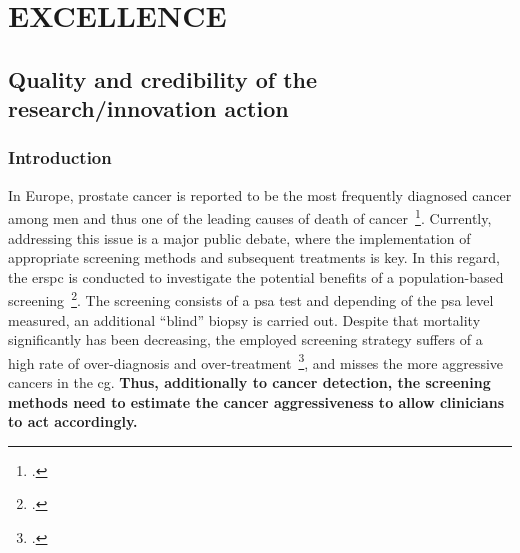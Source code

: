 \section{EXCELLENCE}
\label{sec:excellence}

\subsection{Quality and credibility of the research/innovation action}
\label{sec:quality}

\subsubsection{Introduction}
\label{sec:introduction}

In Europe, prostate cancer is reported to be the most frequently diagnosed cancer among men and thus one of the leading causes of death of cancer~\footcite{Ferlay2013}. 
Currently, addressing this issue is a major public debate, where the implementation of appropriate screening methods and subsequent treatments is key.
In this regard, the \ac{erspc} is conducted to investigate the potential benefits of a population-based screening~\footcite{Schroder2015}. 
The screening consists of a \ac{psa} test and depending of the \ac{psa} level measured, an additional ``blind'' biopsy is carried out. 
Despite that mortality significantly has been decreasing, the employed screening strategy suffers of a high rate of over-diagnosis and over-treatment~\footcite{Delpierre2013}, and misses the more aggressive cancers in the \ac{cg}.
\textbf{Thus, additionally to cancer detection, the screening methods need to estimate the cancer aggressiveness to allow clinicians to act accordingly.}

